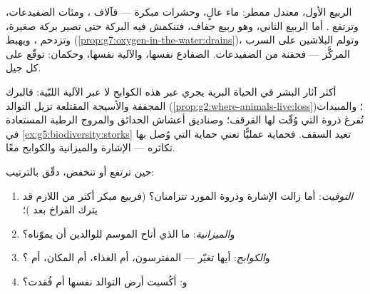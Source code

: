 \begin{example}\label{ex:g8:reproduction-and-environment:twosprings}
الربيع الأول، معتدل ممطر: ماء عالٍ، وحشرات مبكرة --- فآلاف ،
ومئات الضفيدعات، وترتفع
. أما الربيع الثاني، وهو ربيع جفاف،
فتنكمش فيه البركة
حتى تصير بركة صغيرة، وتزدحم ، ويهبط 
(\cref{prop:g7:oxygen-in-the-water:drains})، وتولم البلاشين على
السرب المركَّز --- فحفنة من الضفيدعات. الضفادع نفسها، والآلية
نفسها، وحكمان:  توقّع على كل جيل.
\end{example}

\begin{remark}\label{rem:g8:reproduction-and-environment:humans}
أكثر آثار البشر في الحياة البرية يجري عبر هذه الكوابح لا عبر
الآلية اللبّية: فالبرك المجففة والأسيجة المقتلعة تزيل  التوالد
(\cref{prop:g2:where-animals-live:loss})؛ والمبيدات تُفرغ ذروة
 التي وُقّت لها القرقف؛ وصناديق أعشاش الحدائق والمروج
الرطبة المستعادة في \cref{ex:g5:biodiversity:storks} تعيد السقف.
فحماية  عمليًّا تعني حماية  التي وُصل بها تكاثره ---
الإشارة والميزانية والكوابح معًا.
\end{remark}

\begin{method}\label{met:g8:reproduction-and-environment:audit}
حين ترتفع  أو تنخفض، دقّق بالترتيب:
\begin{enumerate}
  \item \emph{التوقيت}: أما زالت الإشارة وذروة المورد
        تتزامنان؟ (فربيع مبكر أكثر من اللازم قد يترك الفراخ بعد
        )؛
  \item و\emph{الميزانية}: ما الذي أتاح  الموسم للوالدين أن
        يموّناه؟
  \item و\emph{الكوابح}: أيها تغيّر --- المفترسون، أم الغذاء، أم
        المكان، أم ؟
  \item و\emph{}: أكُسبت أرض التوالد نفسها أم فُقدت؟
\end{enumerate}
\end{method}

